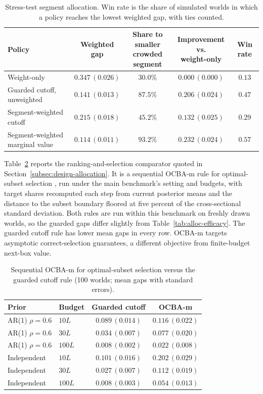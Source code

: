 \documentclass[11pt]{article}
\theoremstyle{definition}
\theoremstyle{remark}
\newcommand{\1}{\mathbf{1}}
\begin{document}
\begin{table}[h!]
\centering
\scriptsize
\setlength{\tabcolsep}{4pt}
\begin{tabular}{lcccc}
\toprule
Policy & \shortstack{Weighted\\gap} & \shortstack{Share to smaller\\crowded segment} & \shortstack{Improvement vs.\\weight-only} & Win rate \\
\midrule
Weight-only & $0.347\,(0.026)$ & $30.0\%$ & $0.000\,(0.000)$ & $0.13$ \\
Guarded cutoff, unweighted & $0.141\,(0.013)$ & $87.5\%$ & $0.206\,(0.024)$ & $0.47$ \\
Segment-weighted cutoff & $0.215\,(0.018)$ & $45.2\%$ & $0.132\,(0.025)$ & $0.29$ \\
Segment-weighted marginal value & $0.114\,(0.011)$ & $93.2\%$ & $0.232\,(0.024)$ & $0.57$ \\
\bottomrule
\end{tabular}
\caption{Stress-test segment allocation. Win rate is the share of simulated worlds in which a policy reaches the lowest weighted gap, with ties counted.}
\label{tab:segment-stress}
\end{table}
\FloatBarrier

Table~\ref{tab:ocba} reports the ranking-and-selection comparator
quoted in Section~\ref{subsec:design-allocation}. It is a sequential OCBA-m rule for optimal-subset selection
\citep{ChenHeFuLee2008}, run under the main benchmark's setting and
budgets, with target shares recomputed each
step from current posterior means and the distance to the subset
boundary floored at five percent of the cross-sectional standard
deviation. Both rules are run within this benchmark on freshly drawn worlds, so the
guarded gaps differ slightly from Table~\ref{tab:alloc-efficacy}. The
guarded cutoff rule has lower mean gaps in every row. OCBA-m targets
asymptotic correct-selection guarantees, a different objective from
finite-budget next-box value.

\begin{table}[h!]
\centering
\scriptsize
\setlength{\tabcolsep}{5pt}
\begin{tabular}{llcc}
\toprule
Prior & Budget & Guarded cutoff & OCBA-m \\
\midrule
AR(1) $\rho=0.6$ & $10L$  & $0.089\,(0.014)$ & $0.116\,(0.022)$ \\
AR(1) $\rho=0.6$ & $30L$  & $0.034\,(0.007)$ & $0.077\,(0.020)$ \\
AR(1) $\rho=0.6$ & $100L$ & $0.008\,(0.002)$ & $0.022\,(0.008)$ \\
Independent      & $10L$  & $0.101\,(0.016)$ & $0.202\,(0.029)$ \\
Independent      & $30L$  & $0.027\,(0.007)$ & $0.112\,(0.019)$ \\
Independent      & $100L$ & $0.008\,(0.003)$ & $0.054\,(0.013)$ \\
\bottomrule
\end{tabular}
\caption{Sequential OCBA-m for optimal-subset selection versus the guarded cutoff rule (100 worlds; mean gaps with standard errors).}
\label{tab:ocba}
\end{table}
\end{document}
